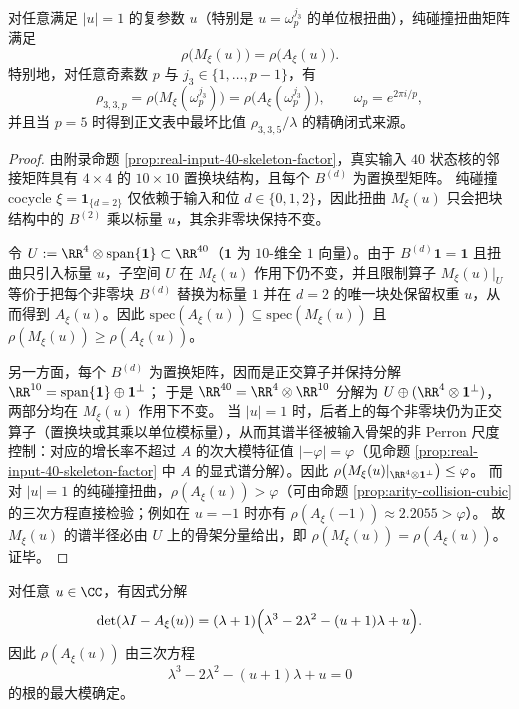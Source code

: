 \begin{theorem}[纯碰撞扭曲的骨架降维：\texorpdfstring{$\rho(M_\xi(u))=\rho(A_\xi(u))$}{rho(M)=rho(A)}]\label{thm:arity-collision-twist-4x4}
对任意满足 \(|u|=1\) 的复参数 \(u\)（特别是 \(u=\omega_p^{j_3}\) 的单位根扭曲），纯碰撞扭曲矩阵满足
$$
\rho\bigl(M_\xi(u)\bigr)=\rho\bigl(A_\xi(u)\bigr).
$$
特别地，对任意奇素数 \(p\) 与 \(j_3\in\{1,\dots,p-1\}\)，有
$$
\rho_{3,3,p}=\rho\bigl(M_\xi(\omega_p^{j_3})\bigr)=\rho\bigl(A_\xi(\omega_p^{j_3})\bigr),
\qquad \omega_p=e^{2\pi i/p},
$$
并且当 \(p=5\) 时得到正文表中最坏比值 \(\rho_{3,3,5}/\lambda\) 的精确闭式来源。
\end{theorem}
\begin{proof}
由附录命题 \ref{prop:real-input-40-skeleton-factor}，真实输入 \(40\) 状态核的邻接矩阵具有 \(4\times 4\) 的 \(10\times 10\) 置换块结构，且每个 \(B^{(d)}\) 为置换型矩阵。
纯碰撞 cocycle \(\xi=\mathbf{1}_{\{d=2\}}\) 仅依赖于输入和位 \(d\in\{0,1,2\}\)，因此扭曲 \(M_\xi(u)\) 只会把块结构中的 \(B^{(2)}\) 乘以标量 \(u\)，其余非零块保持不变。

令 \(U:=\RR^{4}\otimes \mathrm{span}\{\mathbf{1}\}\subset\RR^{40}\)（\(\mathbf{1}\) 为 \(10\)-维全 \(1\) 向量）。由于 \(B^{(d)}\mathbf{1}=\mathbf{1}\) 且扭曲只引入标量 \(u\)，子空间 \(U\) 在 \(M_\xi(u)\) 作用下仍不变，并且限制算子 \(M_\xi(u)|_U\) 等价于把每个非零块 \(B^{(d)}\) 替换为标量 \(1\) 并在 \(d=2\) 的唯一块处保留权重 \(u\)，从而得到 \(A_\xi(u)\)。因此
\(
\mathrm{spec}(A_\xi(u))\subseteq \mathrm{spec}(M_\xi(u))
\)
且 \(\rho(M_\xi(u))\ge \rho(A_\xi(u))\)。

另一方面，每个 \(B^{(d)}\) 为置换矩阵，因而是正交算子并保持分解
\(
\RR^{10}=\mathrm{span}\{\mathbf{1}\}\oplus \mathbf{1}^\perp
\)；
于是
\(
\RR^{40}=\RR^4\otimes \RR^{10}
\)
分解为 \(U\oplus (\RR^4\otimes \mathbf{1}^\perp)\)，两部分均在 \(M_\xi(u)\) 作用下不变。
当 \(|u|=1\) 时，后者上的每个非零块仍为正交算子（置换块或其乘以单位模标量），从而其谱半径被输入骨架的非 Perron 尺度控制：对应的增长率不超过 \(A\) 的次大模特征值 \(|-\varphi|=\varphi\)（见命题 \ref{prop:real-input-40-skeleton-factor} 中 \(A\) 的显式谱分解）。因此
\(
\rho\bigl(M_\xi(u)|_{\RR^4\otimes \mathbf{1}^\perp}\bigr)\le \varphi
\)。
而对 \(|u|=1\) 的纯碰撞扭曲，\(\rho(A_\xi(u))> \varphi\)（可由命题 \ref{prop:arity-collision-cubic} 的三次方程直接检验；例如在 \(u=-1\) 时亦有 \(\rho(A_\xi(-1))\approx 2.2055>\varphi\)）。
故 \(M_\xi(u)\) 的谱半径必由 \(U\) 上的骨架分量给出，即 \(\rho(M_\xi(u))=\rho(A_\xi(u))\)。证毕。
\end{proof}

\begin{remark}\label{prop:arity-collision-cubic}
对任意 \(u\in\CC\)，有因式分解
$$
\det(\lambda I-A_\xi(u))=(\lambda+1)\Bigl(\lambda^3-2\lambda^2-(u+1)\lambda+u\Bigr).
$$
因此 \(\rho(A_\xi(u))\) 由三次方程
$$
\lambda^3-2\lambda^2-(u+1)\lambda+u=0
$$
的根的最大模确定。
\end{remark}

